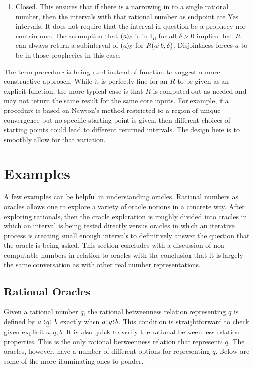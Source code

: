 \documentclass[12pt]{article}
\begin{document}
\begin{enumerate}
    \item Closed. This ensures that if there is a narrowing in to a single rational number, then the intervals with that rational number as endpoint are Yes intervals. It does not require that the interval in question be a prophecy nor contain one. The assumption that $(a)_{\delta}$ is in $\mathbb{I}_R$ for all $\delta >0$ implies that $R$ can always return a subinterval of $(a)_{\delta}$ for $R(a\rint b, \delta)$. Disjointness forces $a$ to be in those prophecies in this case. 

\end{enumerate}

The term procedure is being used instead of function to suggest a more constructive approach. While it is perfectly fine for an $R$ to be given as an explicit function, the more typical case is that $R$ is computed out as needed and may not return the same result for the same core inputs. For example, if a procedure is based on Newton's method restricted to a region of unique convergence but no specific starting point is given, then different choices of starting points could lead to different returned intervals. The design here is to smoothly allow for that variation. 


\section{Examples}

A few examples can be helpful in understanding oracles. Rational numbers as oracles allows one to explore a variety of oracle notions in a concrete way. After exploring rationals, then the oracle exploration is roughly divided into oracles in which an interval is being tested directly versus oracles in which an iterative process is creating small enough intervals to definitively answer the question that the oracle is being asked. This section concludes with a discussion of non-computable numbers in relation to oracles with the conclusion that it is largely the same conversation as with other real number representations. 

\subsection{Rational Oracles}

Given a rational number $q$, the rational betweenness relation representing $q$ is defined by $a \xrel[q] b$ exactly when $a \rint q \rint b$. This condition is straightforward to check given explicit $a, q, b$. It is also quick to verify the rational betweenness relation properties. This is the only rational betweenness relation that represents $q$. The oracles, however, have a number of different options for representing $q$. Below are some of the more illuminating ones to ponder. 
\end{document}
